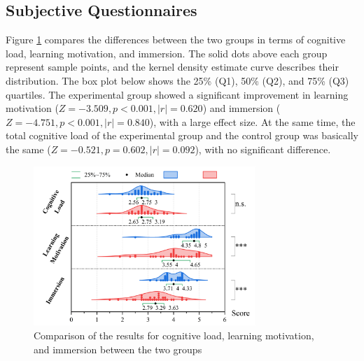\documentclass[runningheads]{llncs}
\begin{document}
\subsection{Subjective Questionnaires}
Figure \ref{fig:user-experience-result} compares the differences between the two groups in terms of cognitive load, learning motivation, and immersion. The solid dots above each group represent sample points, and the kernel density estimate curve describes their distribution. The box plot below shows the 25\% (Q1), 50\% (Q2), and 75\% (Q3) quartiles. The experimental group showed a significant improvement in learning motivation ($Z=-3.509, p<0.001, |r|=0.620$) and immersion ($Z=-4.751, p<0.001, |r|=0.840$), with a large effect size. At the same time, the total cognitive load of the experimental group and the control group was basically the same ($Z=-0.521, p=0.602, |r|=0.092$), with no significant difference.

\begin{figure}[t]
  \centering
  \includegraphics[width=0.75\textwidth]{image/user-experience-result.pdf}
  \caption{Comparison of the results for cognitive load, learning motivation, and immersion between the two groups}
  \label{fig:user-experience-result}
\end{figure}
\end{document}
